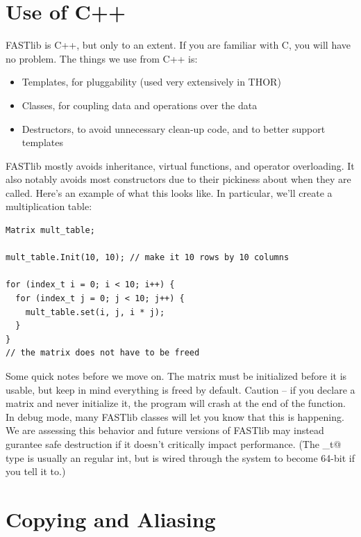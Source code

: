 \documentclass[letter]{report}
\begin{document}
\section{Use of C++}

FASTlib is C++, but only to an extent. If you are familiar with C, you will have no problem. The things we use from C++ is:
\begin{itemize}
\item Templates, for pluggability (used very extensively in THOR)
\item Classes, for coupling data and operations over the data
\item Destructors, to avoid unnecessary clean-up code, and to better support templates 
\end{itemize}
FASTlib mostly avoids inheritance, virtual functions, and operator overloading. It also notably avoids most constructors due to their pickiness about when they are called. Here's an example of what this looks like. In particular, we'll create a multiplication table:
\begin{verbatim}
Matrix mult_table;

mult_table.Init(10, 10); // make it 10 rows by 10 columns

for (index_t i = 0; i < 10; i++) {
  for (index_t j = 0; j < 10; j++) {
    mult_table.set(i, j, i * j);
  }
}
// the matrix does not have to be freed
\end{verbatim}
Some quick notes before we move on. The matrix must be initialized before it is usable, but keep in mind everything is freed by default. Caution -- if you declare a matrix and never initialize it, the program will crash at the end of the function. In debug mode, many FASTlib classes will let you know that this is happening.  We are assessing this behavior and future versions of FASTlib may instead gurantee safe destruction if it doesn't critically impact performance.  (The \verb@index_t@ type is usually an regular int, but is wired through the system to become 64-bit if you tell it to.)

\section{Copying and Aliasing}
\end{document}
